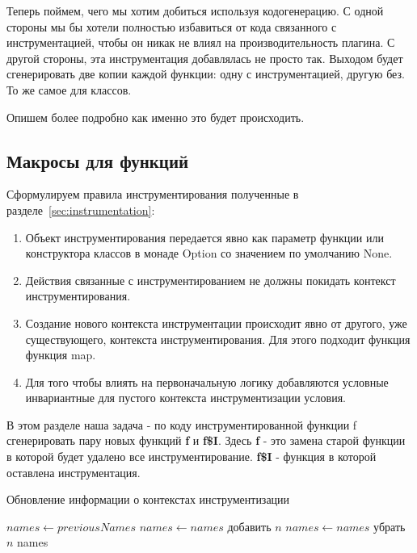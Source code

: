 Теперь поймем, чего мы хотим добиться используя кодогенерацию.
С одной стороны мы бы хотели полностью избавиться от кода связанного с инструментацией,
чтобы он никак не влиял на производительность плагина.
С другой стороны, эта инструментация добавлялась не просто так.
Выходом будет сгенерировать две копии каждой функции: одну с инструментацией,
другую без.
То же самое для классов.

Опишем более подробно как именно это будет происходить.

\subsection{Макросы для функций}
\label{sec:macroFunction}

Сформулируем правила инструментирования полученные в
разделе~\ref{sec:instrumentation}:
\begin{enumerate}
  \item
  \label{itm:ins-constructor}
  Объект инструментирования передается явно как параметр функции или
  конструктора классов в монаде Option со значением по умолчанию None.
  \item
  \label{itm:ins-context}
  Действия связанные с инструментированием не должны покидать контекст
  инструментирования.
  \item
  \label{itm:ins-creating}
  Создание нового контекста инструментации происходит явно от другого,
  уже существующего, контекста инструментирования.
  Для этого подходит функция функция map.
  \item
  \label{itm:ins-logic}
  Для того чтобы влиять на первоначальную логику добавляются условные
  инвариантные для пустого контекста инструментизации условия.
\end{enumerate}



В этом разделе наша задача - по коду инструментированной функции f сгенерировать
пару новых функций \textbf{f} и \textbf{f\$I}.
Здесь \textbf{f} - это замена старой функции в которой будет удалено
все инструментирование.
\textbf{f\$I} - функция в которой оставлена инструментация.

\begin{algorithm}
  \caption{Обновление информации о контекстах инструментизации}\label{alg:names}
  \begin{algorithmic}[1]
    \State $names \gets previousNames$
    \State $names \gets names$ добавить $n$
    \State $names \gets names$ убрать $n$
    \EndIf
    \EndFor
    \State \Return names
    \EndFunction
  \end{algorithmic}
\end{algorithm}

